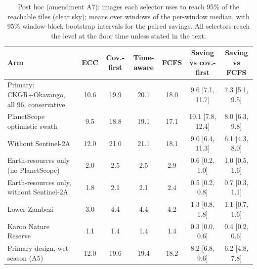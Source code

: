 \begin{table}[!t]
\centering
\footnotesize
\renewcommand{\arraystretch}{1.2}
\setlength{\tabcolsep}{3.5pt}
\caption{Post hoc (amendment A7): images each selector uses to reach 95\% of the reachable tiles (clear sky); means over windows of the per-window median, with 95\% window-block bootstrap intervals for the paired savings. All selectors reach the level at the floor time unless stated in the text.}
\label{tab:a7_images}
\begin{tabular}{|l|c|c|c|c|c|c|}
\hline
Arm & ECC & Cov.-first & Time-aware & FCFS & Saving vs cov.-first & Saving vs FCFS \\
\hline
Primary: CKGR+Okavango, all 96, conservative & 10.6 & 19.9 & 20.1 & 18.0 & 9.6 [7.1, 11.7] & 7.3 [5.1, 9.5] \\
\hline
PlanetScope optimistic swath & 9.5 & 18.8 & 19.1 & 17.1 & 10.1 [7.8, 12.4] & 8.0 [6.3, 9.8] \\
\hline
Without Sentinel-2A & 12.0 & 21.0 & 21.1 & 18.1 & 9.0 [6.4, 11.3] & 6.1 [4.3, 8.0] \\
\hline
Earth-resources only (no PlanetScope) & 2.0 & 2.5 & 2.5 & 2.9 & 0.6 [0.2, 1.0] & 1.0 [0.5, 1.6] \\
\hline
Earth-resources only, without Sentinel-2A & 1.8 & 2.1 & 2.1 & 2.4 & 0.5 [0.2, 0.8] & 0.7 [0.3, 1.1] \\
\hline
Lower Zambezi & 3.0 & 4.4 & 4.4 & 4.2 & 1.3 [0.8, 1.8] & 1.1 [0.7, 1.6] \\
\hline
Karoo Nature Reserve & 1.1 & 1.4 & 1.4 & 1.4 & 0.3 [0.0, 0.6] & 0.4 [0.2, 0.6] \\
\hline
Primary design, wet season (A5) & 12.0 & 19.6 & 19.4 & 18.2 & 8.2 [6.8, 9.6] & 6.2 [4.8, 7.8] \\
\hline
\end{tabular}
\end{table}

